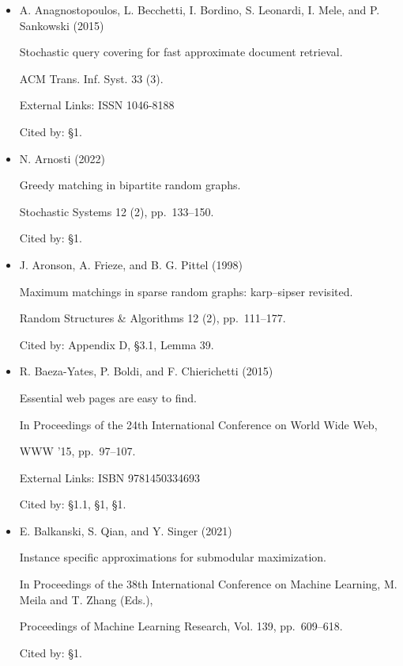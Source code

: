 \documentclass[10pt,a4paper]{article}
\begin{document}
\begin{itemize}


\item[] [1]
A. Anagnostopoulos, L. Becchetti, I. Bordino, S. Leonardi, I. Mele, and P. Sankowski (2015)

Stochastic query covering for fast approximate document retrieval.

ACM Trans. Inf. Syst. 33 (3).

External Links: ISSN 1046-8188

Cited by: §1.



\item[] [2]
N. Arnosti (2022)

Greedy matching in bipartite random graphs.

Stochastic Systems 12 (2), pp. 133–150.

Cited by: §1.



\item[] [3]
J. Aronson, A. Frieze, and B. G. Pittel (1998)

Maximum matchings in sparse random graphs: karp–sipser revisited.

Random Structures \& Algorithms 12 (2), pp. 111–177.

Cited by: Appendix D,
§3.1,
Lemma 39.



\item[] [4]
R. Baeza-Yates, P. Boldi, and F. Chierichetti (2015)

Essential web pages are easy to find.

In Proceedings of the 24th International Conference on World Wide Web,

WWW ’15, pp. 97–107.

External Links: ISBN 9781450334693

Cited by: §1.1,
§1,
§1.



\item[] [5]
E. Balkanski, S. Qian, and Y. Singer (2021)

Instance specific approximations for submodular maximization.

In Proceedings of the 38th International Conference on Machine Learning,  M. Meila and T. Zhang (Eds.),

Proceedings of Machine Learning Research, Vol. 139, pp. 609–618.

Cited by: §1.




\end{itemize}
\end{document}
